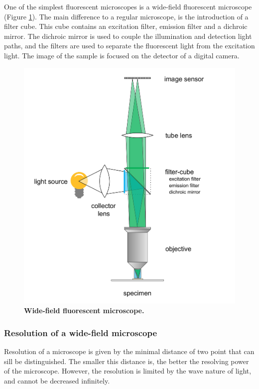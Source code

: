 \documentclass{diploma_style}
\begin{document}
One of the simplest fluorescent microscopes is a wide-field fluorescent microscope (Figure \ref{fig:wide-field}). The main difference to a regular microscope, is the introduction of a filter cube. This cube contains an excitation filter, emission filter and a dichroic mirror. The dichroic mirror is used to couple the illumination and detection light paths, and the filters are used to separate the fluorescent light from the excitation light. The image of the sample is focused on the detector of a digital camera.

\begin{figure}[htbp]
	\centering
	\includegraphics[scale=0.4]{figures/1_introduction/wide-field}
	\caption{\textbf{Wide-field fluorescent microscope.}}
	\label{fig:wide-field}
\end{figure}

\subsubsection{Resolution of a wide-field microscope}

Resolution of a microscope is given by the minimal distance of two point that can sill be distinguished. The smaller this distance is, the better the resolving power of the microscope. However, the resolution is limited by the wave nature of light, and cannot be decreased infinitely.
\end{document}
